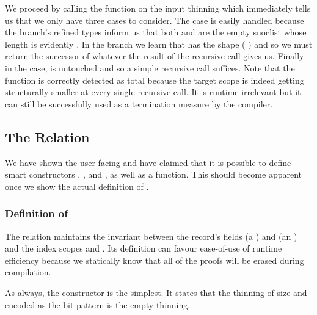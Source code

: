 
We proceed by calling the  function on the input thinning
which immediately tells us that we only have three cases to consider.
%
The  case is easily handled because the branch's refined
types inform us that both  and  are the
empty snoclist \IdrisData{[<]} whose length is evidently .
%
In the  branch we learn that  has the shape
(\IdrisBound{\KatlaUnderscore} \IdrisData{:<} ) and so we must return the
successor of whatever the result of the recursive call gives us.
%
Finally in the  case,  is untouched and so a
simple recursive call suffices.
%
Note that the function is correctly detected as total because the target scope
 is indeed getting structurally smaller at every single recursive
call.
%
It is runtime irrelevant but it can still be successfully used as a termination
measure by the compiler.

\subsection{The  Relation}\label{sec:thininginternal}

We have shown the user-facing  and have claimed that it is possible
to define smart constructors , ,
and , as well as a  function.
%
This should become apparent once we show the actual definition of .

\subsubsection{Definition of }

The relation maintains the invariant between the record's
fields  (a )
and  (an )
and the index scopes  and .
%
Its definition can favour ease-of-use of runtime efficiency because we statically
know that all of the  proofs will be erased during compilation.


As always, the  constructor is the simplest.
%
It states that the thinning of size  and encoded as the bit
pattern  is the empty thinning.

